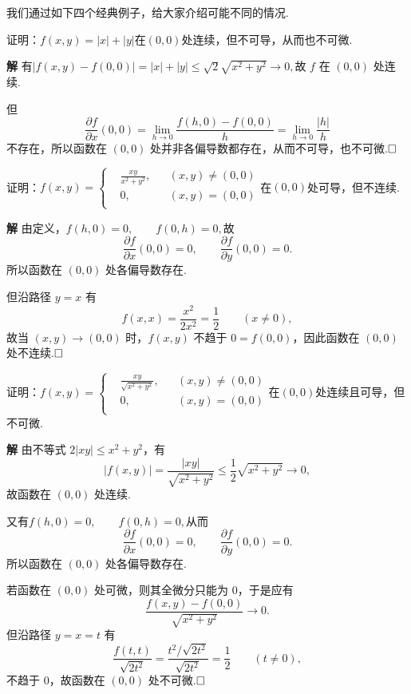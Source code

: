\documentclass{ctexart}
\newenvironment{custom}[1]{\par\noindent \textbf{#1}\quad}{\par\vspace{1em}}
\begin{document}
我们通过如下四个经典例子，给大家介绍可能不同的情况.

\begin{example}
证明：$f(x,y)=|x|+|y|$在$(0,0)$处连续，但不可导，从而也不可微.
\end{example}

\begin{custom}{解}
有$|f(x,y)-f(0,0)|=|x|+|y|\leqslant \sqrt{2}\sqrt{x^2+y^2}\to 0,$故 $f$ 在 $(0,0)$ 处连续.

但
$$\frac{\partial f}{\partial x}(0,0)
=\lim\limits_{h\to 0}\frac{f(h,0)-f(0,0)}{h}
=\lim\limits_{h\to 0}\frac{|h|}{h}$$
不存在，所以函数在 $(0,0)$ 处并非各偏导数都存在，从而不可导，也不可微.$\hfill{\square}$
\end{custom}

\begin{example}
证明：$f(x,y)=\left\{\begin{aligned}&\frac{xy}{x^{2}+y^{2}},&& (x,y)\neq (0,0)\\&0, &&(x,y)=(0,0)\\\end{aligned}\right.$在$(0,0)$处可导，但不连续.
\end{example}

\begin{custom}{解}
由定义，$f(h,0)=0,\qquad f(0,h)=0,$故
$$\frac{\partial f}{\partial x}(0,0)=0,\qquad
\frac{\partial f}{\partial y}(0,0)=0.$$
所以函数在 $(0,0)$ 处各偏导数存在.

但沿路径 $y=x$ 有
$$f(x,x)=\frac{x^2}{2x^2}=\frac12\qquad (x\neq 0),$$
故当 $(x,y)\to(0,0)$ 时，$f(x,y)$ 不趋于 $0=f(0,0)$，因此函数在 $(0,0)$ 处不连续.$\hfill{\square}$
\end{custom}

\begin{example}
证明：$f(x,y)=\left\{\begin{aligned}&\frac{xy}{\sqrt{x^{2}+y^{2}}},&& (x,y)\neq (0,0)\\&0, &&(x,y)=(0,0)\\\end{aligned}\right.$在$(0,0)$处连续且可导，但不可微.
\end{example}

\begin{custom}{解}
由不等式 $2|xy|\leqslant x^2+y^2$，有
$$|f(x,y)|=\frac{|xy|}{\sqrt{x^2+y^2}}
\leqslant \frac12\sqrt{x^2+y^2}\to 0,$$
故函数在 $(0,0)$ 处连续.

又有$f(h,0)=0,\qquad f(0,h)=0,$从而
$$\frac{\partial f}{\partial x}(0,0)=0,\qquad
\frac{\partial f}{\partial y}(0,0)=0.$$
所以函数在 $(0,0)$ 处各偏导数存在.

若函数在 $(0,0)$ 处可微，则其全微分只能为 $0$，于是应有
$$\frac{f(x,y)-f(0,0)}{\sqrt{x^2+y^2}}\to 0.$$
但沿路径 $y=x=t$ 有
$$\frac{f(t,t)}{\sqrt{2t^2}}
=\frac{t^2/\sqrt{2t^2}}{\sqrt{2t^2}}
=\frac12\qquad (t\neq 0),$$
不趋于 $0$，故函数在 $(0,0)$ 处不可微.$\hfill{\square}$
\end{custom}
\end{document}
